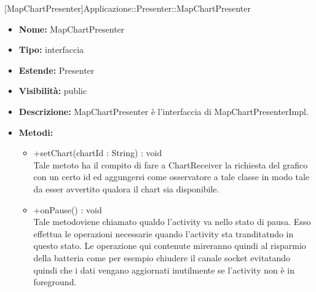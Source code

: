			
			[MapChartPresenter]{Applicazione::Presenter::MapChartPresenter}
			

	
			
			\begin{itemize}
			\item \textbf{Nome:} MapChartPresenter
			\item \textbf{Tipo:} interfaccia
			
		\item \textbf{Estende:}
		Presenter
			\item \textbf{Visibilità:} public
			\item \textbf{Descrizione:} MapChartPresenter è l'interfaccia di MapChartPresenterImpl.
			\item \textbf{Metodi:}
				\begin{itemize}
				\setlength{\itemsep}{5pt}
				
					\item[\ding{111}] {{+setChart(chartId : String) : void}} \\ [1mm] Tale metoto ha il compito di fare a ChartReceiver la richiesta del grafico con un certo id ed aggungersi come osservatore a tale classe in modo tale da esser avvertito qualora il chart sia disponibile.
					\item[\ding{111}] {{+onPause() : void}} \\ [1mm] Tale metodoviene chiamato qualdo l'activity va nello stato di pausa. Esso effettua le operazioni necessarie quando l'activity sta tranditatndo in questo stato. Le operazione qui contenute mireranno quindi al risparmio della batteria come per esempio chiudere il canale socket evitatando quindi che i dati vengano aggiornati inutilmente se l'activity non è in foreground.
				\end{itemize}
		
			\end{itemize}

